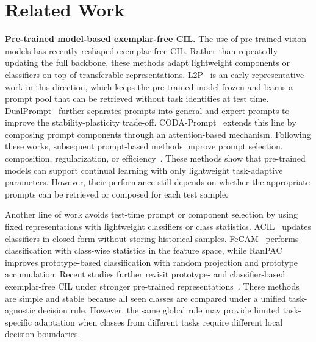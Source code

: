\section{Related Work}
\label{sec:related}

\noindent\textbf{Pre-trained model-based exemplar-free CIL.}
The use of pre-trained vision models has recently reshaped exemplar-free CIL. Rather than repeatedly updating the full backbone, these methods adapt lightweight components or classifiers on top of transferable representations.
L2P~\cite{wang2022learning} is an early representative work in this direction, which keeps the pre-trained model frozen and learns a prompt pool that can be retrieved without task identities at test time.
DualPrompt~\cite{wang2022dualprompt} further separates prompts into general and expert prompts to improve the stability-plasticity trade-off.
CODA-Prompt~\cite{smith2023coda} extends this line by composing prompt components through an attention-based mechanism.
Following these works, subsequent prompt-based methods improve prompt selection, composition, regularization, or efficiency~\cite{tang2023prompt,khan2023introducing,kim2024one,kurniawan2024evolving,qiao2024prompt,huang2024ovor,roy2024convolutional,gao2024consistent,lu2024visual,zhang2025vpt}.
These methods show that pre-trained models can support continual learning with only lightweight task-adaptive parameters. However, their performance still depends on whether the appropriate prompts can be retrieved or composed for each test sample.

Another line of work avoids test-time prompt or component selection by using fixed representations with lightweight classifiers or class statistics.
ACIL~\cite{acil2022} updates classifiers in closed form without storing historical samples.
FeCAM~\cite{fecam2023} performs classification with class-wise statistics in the feature space, while RanPAC~\cite{ranpac2023} improves prototype-based classification with random projection and prototype accumulation.
Recent studies further revisit prototype- and classifier-based exemplar-free CIL under stronger pre-trained representations~\cite{zhou2025revisiting,wang2024min}.
These methods are simple and stable because all seen classes are compared under a unified task-agnostic decision rule.
However, the same global rule may provide limited task-specific adaptation when classes from different tasks require different local decision boundaries.

